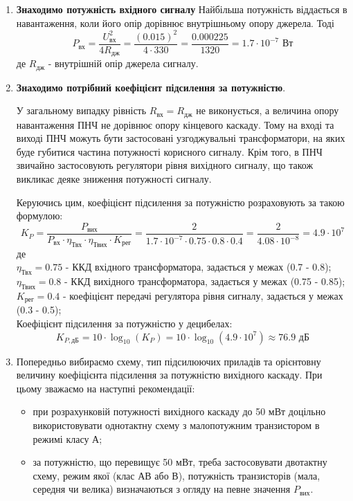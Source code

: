 \documentclass[main.tex]{subfiles}
\begin{document}
\begin{enumerate}
\item \textbf{Знаходимо потужність вхідного сигналу} \newline
Найбільша потужність віддається в навантаження, коли його опір дорівнює
внутрішньому опору джерела. Тоді
\[
P_\text{вх} = \frac{U_\text{вх}^2}{4R_\text{дж}} = \frac{(0.015)^2}{4 \cdot 330} = \frac{0.000225}{1320} = 1.7 \cdot 10^{-7} \text{ Вт}
\]
де $R_{\text{дж}}$ - внутрішній опір джерела сигналу.

\item \textbf{Знаходимо потрібний коефіцієнт підсилення за потужністю}.

У загальному випадку рівність $R_{\text{вх}} = R_{\text{дж}}$ не виконується, а величина опору навантаження ПНЧ не дорівнює опору кінцевого каскаду. Тому на вході та виході
ПНЧ можуть бути застосовані узгоджувальні трансформатори, на яких буде
губитися частина потужності корисного сигналу. Крім того, в ПНЧ звичайно
застосовують регулятори рівня вихідного сигналу, що також викликає деяке
зниження потужності сигналу.

Керуючись цим, коефіцієнт підсилення за потужністю розраховують за
такою формулою:
\[
K_P = \frac{P_\text{вих}}{P_\text{вх} \cdot \eta_\text{Твх} \cdot \eta_\text{Твих} \cdot K_\text{рег}} = \frac{2}{1.7 \cdot 10^{-7} \cdot 0.75 \cdot 0.8 \cdot 0.4} = \frac{2}{4.08 \cdot 10^{-8}} = 4.9 \cdot 10^7
\]
де\\
$\eta_{\text{Твх}} = 0.75$ - ККД вхідного трансформатора, задається у межах (0.7 - 0.8);\\
$\eta_{\text{Твих}} = 0.8$ - ККД вихідного трансформатора, задається у межах (0.75 - 0.85);\\
$K_\text{рег} = 0.4$ - коефіцієнт передачі регулятора рівня сигналу, задається у межах (0.3 - 0.5);\\

Коефіцієнт підсилення за потужністю у децибелах:
\[
K_{P,\text{дБ}} = 10 \cdot \log_{10}(K_P) = 10 \cdot \log_{10}(4.9 \cdot 10^7) \approx 76.9 \text{ дБ}
\]

\item Попередньо вибираємо схему, тип підсилюючих приладів та
орієнтовну величину коефіцієнта підсилення за потужністю вихідного каскаду.
При цьому зважаємо на наступні рекомендації:
\begin{itemize}
    \item при розрахунковій потужності вихідного каскаду до 50 мВт доцільно
використовувати однотактну схему з малопотужним транзистором в режимі класу
А;
    \item за потужністю, що перевищує 50 мВт, треба застосовувати двотактну
схему, режим якої (клас АВ або В), потужність транзисторів (мала, середня чи
велика) визначаються з огляду на певне значення $P_{\text{вих}}$.
\end{itemize}


\end{enumerate}
\end{document}
